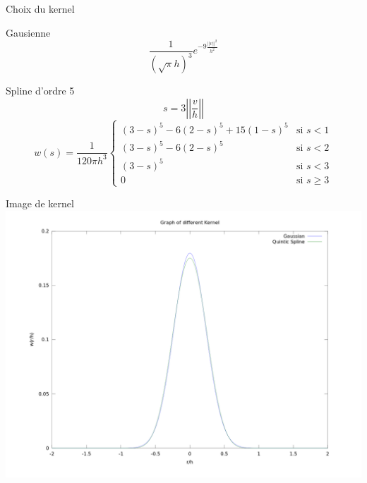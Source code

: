 \begin{frame}{Choix du kernel}
\begin{block}{Gausienne}
\begin{equation*}
 \frac{1}{(\sqrt{\pi} h)^3}e^{-9\frac{||v||^2}{h^2}}
\end{equation*}
\end{block}

\begin{block}{Spline d'ordre 5}
\begin{equation*}
     s=3\left|\left|\frac{v}{h}\right|\right|
\end{equation*}
\small
\begin{equation*}
     w(s)=\frac{1}{120\pi h^3} \begin{cases} (3-s)^5-6(2-s)^5+15(1-s)^5 & \text{si $s<1$}\\
   (3-s)^5-6(2-s)^5& \text{si $s<2$}\\
   (3-s)^5& \text{si $s<3$}\\
   0& \text{si $s\geq 3$} \end{cases}
   \end{equation*}
\end{block}
\end{frame}
\begin{frame}{Image de kernel}
 \includegraphics[width=\textwidth]{kernel.png}
\end{frame}

